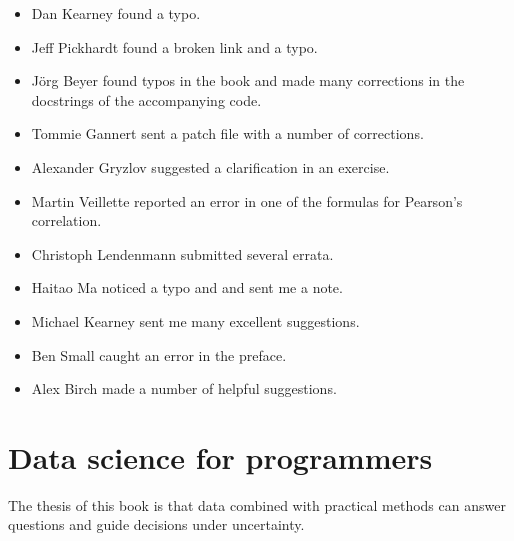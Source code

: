 \documentclass[12pt]{book}
\begin{document}
\begin{itemize}
\item Dan Kearney found a typo.

\item Jeff Pickhardt found a broken link and a typo.

\item J\"{o}rg Beyer found typos in the book and made many corrections
in the docstrings of the accompanying code.

\item Tommie Gannert sent a patch file with a number of corrections.

\item Alexander Gryzlov suggested a clarification in an exercise.

\item Martin Veillette reported an error in one of the formulas for
Pearson's correlation.

\item Christoph Lendenmann submitted several errata.

\item Haitao Ma noticed a typo and and sent me a note.

\item Michael Kearney sent me many excellent suggestions.

\item Ben Small caught an error in the preface.

\item Alex Birch made a number of helpful suggestions.


\end{itemize}

\normalsize

\clearemptydoublepage

\begin{latexonly}

\tableofcontents

\clearemptydoublepage

\end{latexonly}

\mainmatter


\chapter{Data science for programmers}
\label{intro}

The thesis of this book is that data combined with practical
methods can answer questions and guide decisions under uncertainty.
\end{document}
